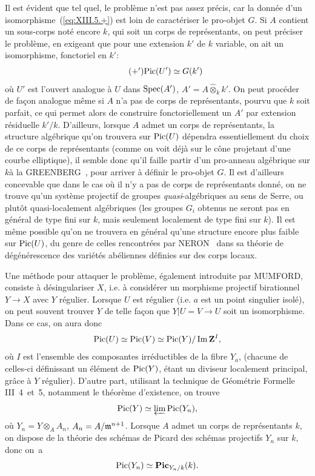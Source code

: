 Il est \'evident que tel quel, le probl\`eme n'est pas assez pr\'ecis, car la donn\'ee d'un isomorphisme~(\ref{eq:XIII.5.+}) est loin de caract\'eriser le pro-objet $G$. Si $A$ contient un sous-corps not\'e encore $k$, qui soit un corps de repr\'esentants, on peut pr\'eciser le probl\`eme, en exigeant que pour une extension $k'$ de $k$ variable, on ait un isomorphisme, fonctoriel en $k'$: \begin{equation*} \label{eq:XIII.5.+'} \tag{$+'$} {\operatorname{Pic}(U')\simeq G(k')} \end{equation*} o\`u $U'$ est l'ouvert analogue \`a $U$ dans $\operatorname{Spec}(A')$, $A'=A\hat{\otimes}_k k'$. On peut proc\'eder de fa\c con analogue m\^eme si $A$ n'a pas de corps de repr\'esentants, pourvu que $k$ soit parfait, ce qui permet alors de construire fonctoriellement un $A'$ \og par extension r\'esiduelle $k'/k$\fg. D'ailleurs, lorsque $A$ admet un corps de repr\'esentants, la structure alg\'ebrique qu'on trouvera sur $\operatorname{Pic}(U)$ d\'ependra essentiellement du choix de ce corps de repr\'esentants (comme on voit d\'ej\`a sur le c\^{o}ne projetant d'une courbe elliptique), il semble donc qu'il faille partir d'un \og pro-anneau alg\'ebrique sur $k$\fg \`a la GREENBERG~\cite{XIII.3}, pour arriver \`a d\'efinir le pro-objet $G$. Il est d'ailleurs concevable que dans le cas o\`u il n'y a pas de corps de repr\'esentants donn\'e, on ne trouve qu'un syst\`eme projectif de groupes \emph{quasi}-alg\'ebriques au sens de Serre, ou plut\^{o}t quasi-localement alg\'ebriques (les groupes $G_i$ obtenus ne seront pas en g\'en\'eral de type fini sur $k$, mais seulement localement de type fini sur $k$). Il est m\^eme possible qu'on ne trouvera en g\'en\'eral qu'une structure encore plus faible sur $\operatorname{Pic}(U)$, du genre de celles rencontr\'ees par NERON~\cite{XIII.6} dans sa th\'eorie de d\'eg\'en\'erescence des vari\'et\'es ab\'eliennes d\'efinies sur des corps locaux.

Une m\'ethode pour attaquer le probl\`eme, \'egalement introduite par MUMFORD, consiste \`a d\'esingulariser $X$, i.e. \`a consid\'erer un morphisme projectif birationnel $Y\to X$ avec $Y$ r\'egulier. Lorsque $U$ est r\'egulier (i.e. $a$ est un point singulier isol\'e), on peut souvent trouver $Y$ de telle fa\c con que $Y|U=V\to U$ soit un isomorphisme. Dans ce cas, on aura donc $$ \operatorname{Pic}(U)\simeq\operatorname{Pic}(V)\simeq\operatorname{Pic}(Y)/\operatorname{Im} \mathbf{Z}^I, $$ o\`u $I$ est l'ensemble des composantes irr\'eductibles de la fibre $Y_{a}$,  (chacune de celles-ci d\'efinissant un \'el\'ement de $\operatorname{Pic}(Y)$, \'etant un diviseur localement principal, gr\^ace \`a $Y$ r\'egulier). D'autre part, utilisant la technique de G\'eom\'etrie Formelle \EGA III~4~et~5, notamment le th\'eor\`eme d'existence, on trouve $$ \operatorname{Pic}(Y)\simeq\varprojlim\operatorname{Pic}(Y_n), $$ o\`u $Y_n=Y\otimes_A A_n$, $A_n=A/\mathfrak{m}^{n+1}$. Lorsque $A$ admet un corps de repr\'esentants $k$, on dispose de la th\'eorie des sch\'emas de Picard des sch\'emas projectifs $Y_n$ sur $k$, donc on~a $$ \operatorname{Pic}(Y_n)\simeq \mathbf{Pic}_{Y_n/k}(k). $$

